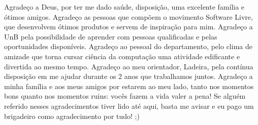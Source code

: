 Agradeço a Deus, por ter me dado saúde, disposição, uma excelente família e ótimos
amigos. 
Agradeço as pessoas que compõem o movimento Software Livre, que desenvolvem ótimos
produtos e servem de inspiração para mim. 
Agradeço a UnB pela possibilidade de aprender com pessoas qualificadas e pelas 
oportunidades disponíveis.
Agradeço ao pessoal do departamento, pelo clima de
amizade que torna cursar ciência da computação uma atividade edificante e divertida
ao mesmo tempo. 
Agradeço ao meu orientador, Ladeira, pela contínua disposição em me ajudar durante
os 2 anos que trabalhamos juntos.  
Agradeço a minha família e aos meus amigos por estarem ao meu lado, tanto nos
momentos bons quanto nos momentos ruins: vocês fazem a vida valer a pena! 
Se alguém referido nesses agradecimentos tiver lido até aqui, basta me avisar e eu
pago um brigadeiro como agradecimento por tudo! ;) 
